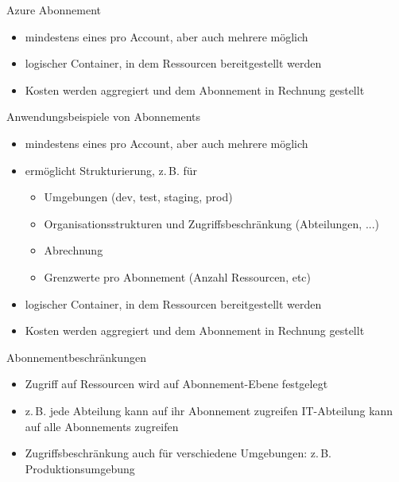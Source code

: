
\begin{flashcard}[Describe]{Azure Abonnement}
    \begin{itemize}
        \item mindestens eines pro Account, aber auch mehrere möglich
        \item logischer Container, in dem Ressourcen bereitgestellt werden
        \item Kosten werden aggregiert und dem Abonnement in Rechnung gestellt
    \end{itemize}
\end{flashcard}

\begin{flashcard}[\ ]{Anwendungsbeispiele von Abonnements}
    \begin{itemize}
        \item mindestens eines pro Account, aber auch mehrere möglich
        \item ermöglicht Strukturierung, z.\,B. für
        \begin{itemize}
            \item Umgebungen (dev, test, staging, prod)
            \item Organisationsstrukturen und Zugriffsbeschränkung (Abteilungen, ...)
            \item Abrechnung
            \item Grenzwerte pro Abonnement (Anzahl Ressourcen, etc)
        \end{itemize}
        \item logischer Container, in dem Ressourcen bereitgestellt werden
        \item Kosten werden aggregiert und dem Abonnement in Rechnung gestellt
    \end{itemize}
\end{flashcard}

\begin{flashcard}[\ ]{Abonnementbeschränkungen}
    \begin{itemize}
        \item Zugriff auf Ressourcen wird auf Abonnement-Ebene festgelegt
        \item z.\,B. jede Abteilung kann auf ihr Abonnement zugreifen\newline
            IT-Abteilung kann auf alle Abonnements zugreifen
        \item Zugriffsbeschränkung auch für verschiedene Umgebungen:\newline
            z.\,B. Produktionsumgebung
    \end{itemize}
\end{flashcard}

